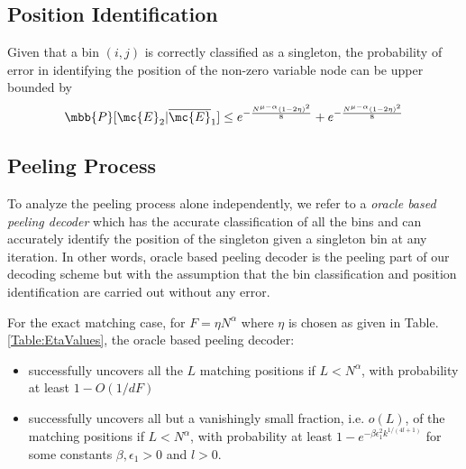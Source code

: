 \subsection{\bf Position Identification}
\begin{lemma}
Given that a bin $(i,j)$ is correctly classified as a singleton, the probability of error in identifying the position of the non-zero variable node can be upper bounded by
\begin{align*}
\mbb{P}[\mc{E}_2|\overline{\mc{E}}_1]\leq e^{-\frac{N^{\mu-\alpha}(1-2\eta)^2}{8}}+e^{-\frac{N^{\mu-\alpha}(1-2\eta)^2}{8}}
\end{align*}
\end{lemma}

\subsection{\bf Peeling Process}
To analyze the peeling process alone independently, we refer to a {\it oracle based peeling decoder} which has the accurate classification of all the bins and can accurately  identify the position of the singleton given a singleton bin at any iteration. In other words, oracle based peeling decoder is the peeling part of our decoding scheme but with the assumption that the bin classification and position identification are carried out without any error.
\begin{lemma}
For the exact matching case, for $F=\eta N^\alpha$ where $\eta$ is chosen as given in Table. \ref{Table:EtaValues}, the oracle based peeling decoder:
\begin{itemize}
\item successfully uncovers all the $L$ matching positions if $L<N^{\alpha}$, with probability at least $1-O(1/dF)$
\item successfully uncovers all but a vanishingly small fraction, i.e. $o(L)$, of the matching positions if $L<N^{\alpha}$, with probability at least $1-e^{-\beta \epsilon_1^2k^{1/(4l+1)}}$ for some constants $\beta,\epsilon_1>0$ and $l>0.$
\end{itemize}
\end{lemma}
